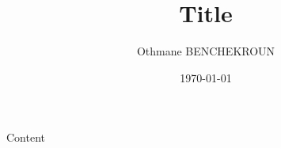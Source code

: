 \documentclass[]{article}
\begin{document}
\title{Title}
\author{Othmane BENCHEKROUN}
\date{\today}
\maketitle

Content
\end{document}
